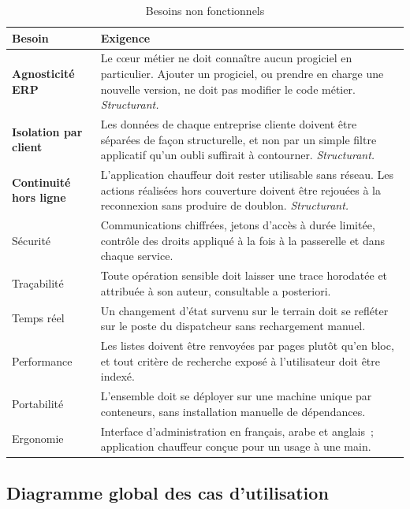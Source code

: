 \begin{table}[H]
\centering
\caption{Besoins non fonctionnels}
\label{tab:besoins-nf}
\begin{tabular}{L{3.4cm}L{11.1cm}}
\hline
{}
\textbf{Besoin} & \textbf{Exigence} \\
\hline
\textbf{Agnosticité ERP} & Le cœur métier ne doit connaître aucun progiciel en particulier. Ajouter
un progiciel, ou prendre en charge une nouvelle version, ne doit pas modifier le code métier.
\emph{Structurant.} \\
\hline
\textbf{Isolation par client} & Les données de chaque entreprise cliente doivent être séparées de
façon structurelle, et non par un simple filtre applicatif qu'un oubli suffirait à contourner.
\emph{Structurant.} \\
\hline
\textbf{Continuité hors ligne} & L'application chauffeur doit rester utilisable sans réseau. Les
actions réalisées hors couverture doivent être rejouées à la reconnexion sans produire de doublon.
\emph{Structurant.} \\
\hline
Sécurité & Communications chiffrées, jetons d'accès à durée limitée, contrôle des droits appliqué à
la fois à la passerelle et dans chaque service. \\
\hline
Traçabilité & Toute opération sensible doit laisser une trace horodatée et attribuée à son auteur,
consultable a posteriori. \\
\hline
Temps réel & Un changement d'état survenu sur le terrain doit se refléter sur le poste du
dispatcheur sans rechargement manuel. \\
\hline
Performance & Les listes doivent être renvoyées par pages plutôt qu'en bloc, et tout critère de
recherche exposé à l'utilisateur doit être indexé. \\
\hline
Portabilité & L'ensemble doit se déployer sur une machine unique par conteneurs, sans installation
manuelle de dépendances. \\
\hline
Ergonomie & Interface d'administration en français, arabe et anglais~; application chauffeur
conçue pour un usage à une main. \\
\hline
\end{tabular}
\end{table}

\subsection{Diagramme global des cas d'utilisation}

